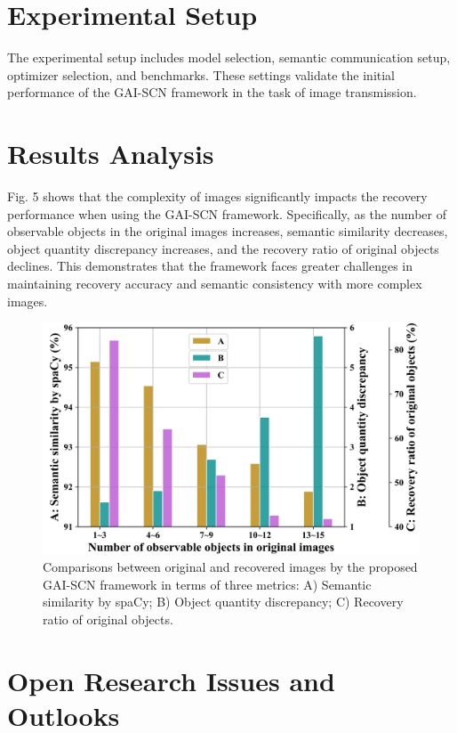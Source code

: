 \documentclass{article}
\begin{document}
\section{Experimental Setup}

The experimental setup includes model selection, semantic communication setup, optimizer selection, and benchmarks. These settings validate the initial performance of the GAI-SCN framework in the task of image transmission.

\section{Results Analysis}

Fig. 5 shows that the complexity of images significantly impacts the recovery performance when using the GAI-SCN framework. Specifically, as the number of observable objects in the original images increases, semantic similarity decreases, object quantity discrepancy increases, and the recovery ratio of original objects declines. This demonstrates that the framework faces greater challenges in maintaining recovery accuracy and semantic consistency with more complex images.

\begin{figure}[h]
    \centering
    \includegraphics[width=\textwidth]{image.png}
    \caption{Comparisons between original and recovered images by the proposed GAI-SCN framework in terms of three metrics: A) Semantic similarity by spaCy; B) Object quantity discrepancy; C) Recovery ratio of original objects.}
\end{figure}

\section{Open Research Issues and Outlooks}
\end{document}
